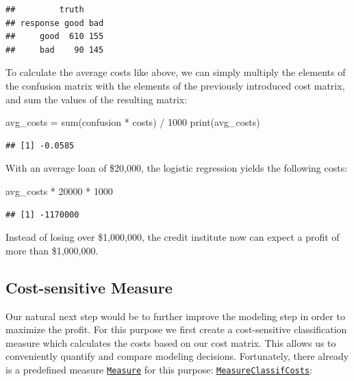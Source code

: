 \documentclass[
]{scrbook}
\newenvironment{Shaded}{\begin{snugshade}}{\end{snugshade}}
\newcommand{\DecValTok}[1]{\textcolor[rgb]{0.00,0.00,0.81}{#1}}
\newcommand{\FunctionTok}[1]{\textcolor[rgb]{0.00,0.00,0.00}{#1}}
\newcommand{\NormalTok}[1]{#1}
\newcommand{\OtherTok}[1]{\textcolor[rgb]{0.56,0.35,0.01}{#1}}
\newcommand{\SpecialCharTok}[1]{\textcolor[rgb]{0.00,0.00,0.00}{#1}}
\renewenvironment{Shaded} {\begin{snugshade}\small} {\end{snugshade}}
\begin{document}
\begin{verbatim}
##         truth
## response good bad
##     good  610 155
##     bad    90 145
\end{verbatim}

To calculate the average costs like above, we can simply multiply the elements of the confusion matrix with the elements of the previously introduced cost matrix, and sum the values of the resulting matrix:

\begin{Shaded}
\begin{Highlighting}[]
\NormalTok{avg\_costs }\OtherTok{=} \FunctionTok{sum}\NormalTok{(confusion }\SpecialCharTok{*}\NormalTok{ costs) }\SpecialCharTok{/} \DecValTok{1000}
\FunctionTok{print}\NormalTok{(avg\_costs)}
\end{Highlighting}
\end{Shaded}

\begin{verbatim}
## [1] -0.0585
\end{verbatim}

With an average loan of \$20,000, the logistic regression yields the following costs:

\begin{Shaded}
\begin{Highlighting}[]
\NormalTok{avg\_costs }\SpecialCharTok{*} \DecValTok{20000} \SpecialCharTok{*} \DecValTok{1000}
\end{Highlighting}
\end{Shaded}

\begin{verbatim}
## [1] -1170000
\end{verbatim}

Instead of losing over \$1,000,000, the credit institute now can expect a profit of more than \$1,000,000.

\hypertarget{cost-sensitive-measure}{%
\subsection{Cost-sensitive Measure}\label{cost-sensitive-measure}}

Our natural next step would be to further improve the modeling step in order to maximize the profit.
For this purpose we first create a cost-sensitive classification measure which calculates the costs based on our cost matrix.
This allows us to conveniently quantify and compare modeling decisions.
Fortunately, there already is a predefined measure \href{https://mlr3.mlr-org.com/reference/Measure.html}{\texttt{Measure}} for this purpose: \href{https://mlr3.mlr-org.com/reference/mlr_measures_classif.costs.html}{\texttt{MeasureClassifCosts}}:
\end{document}
